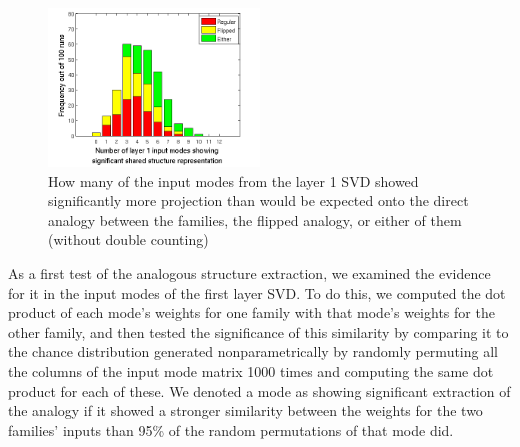 \documentclass[10pt,letterpaper]{article}
\begin{document}
\begin{figure}\centering
\includegraphics[width=0.5\textwidth]{figures/ft_input_mode_significance_hist.png}
\caption{How many of the input modes from the layer 1 SVD showed significantly more projection than would be expected onto the direct analogy between the families, the flipped analogy, or either of them (without double counting)}
\label{ft_input_mode_sig_hist}
\end{figure}
As a first test of the analogous structure extraction, we examined the evidence for it in the input modes of the first layer SVD. To do this, we computed the dot product of each mode's weights for one family with that mode's weights for the other family, and then tested the significance of this similarity by comparing it to the chance distribution generated nonparametrically by randomly permuting all the columns of the input mode matrix 1000 times and computing the same dot product for each of these. We denoted a mode as showing significant extraction of the analogy if it showed a stronger similarity between the weights for the two families' inputs than 95\% of the random permutations of that mode did. \par
\end{document}
